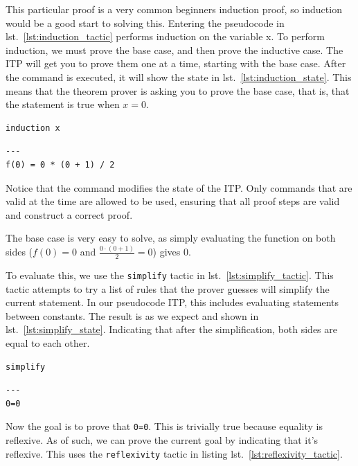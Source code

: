 \documentclass[
]{article}
\newcommand{\passthrough}[1]{#1}
\begin{document}
This particular proof is a very common beginners induction proof, so
induction would be a good start to solving this. Entering the pseudocode
in lst.~\ref{lst:induction_tactic} performs induction on the variable x.
To perform induction, we must prove the base case, and then prove the
inductive case. The ITP will get you to prove them one at a time,
starting with the base case. After the command is executed, it will show
the state in lst.~\ref{lst:induction_state}. This means that the theorem
prover is asking you to prove the base case, that is, that the statement
is true when \(x = 0\).

\begin{lstlisting}[caption={Running the induction tactic}, label=lst:induction_tactic]
induction x
\end{lstlisting}

\begin{lstlisting}[caption={State after the induction tactic}, label=lst:induction_state]
---
f(0) = 0 * (0 + 1) / 2
\end{lstlisting}

Notice that the command modifies the state of the ITP. Only commands
that are valid at the time are allowed to be used, ensuring that all
proof steps are valid and construct a correct proof.

The base case is very easy to solve, as simply evaluating the function
on both sides (\(f(0) = 0\) and \(\frac {0 \cdot (0 + 1)}{2} = 0\))
gives 0.

To evaluate this, we use the \passthrough{\lstinline!simplify!} tactic
in lst.~\ref{lst:simplify_tactic}. This tactic attempts to try a list of
rules that the prover guesses will simplify the current statement. In
our pseudocode ITP, this includes evaluating statements between
constants. The result is as we expect and shown in
lst.~\ref{lst:simplify_state}. Indicating that after the simplification,
both sides are equal to each other.

\begin{lstlisting}[caption={Running the simplify tactic}, label=lst:simplify_tactic]
simplify
\end{lstlisting}

\begin{lstlisting}[caption={State after running the simplify tactic}, label=lst:simplify_state]
---
0=0
\end{lstlisting}

Now the goal is to prove that \passthrough{\lstinline!0=0!}. This is
trivially true because equality is reflexive. As of such, we can prove
the current goal by indicating that it's reflexive. This uses the
\passthrough{\lstinline!reflexivity!} tactic in listing
lst.~\ref{lst:reflexivity_tactic}.
\end{document}

